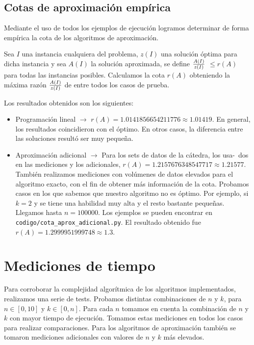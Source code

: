 \documentclass{article}
\begin{document}
\subsection{Cotas de aproximación empírica}

Mediante el uso de todos los ejemplos de ejecución logramos determinar de forma empírica la cota de los algoritmos de aproximación. 

Sea \(I\) una instancia cualquiera del problema, \(z(I)\) una solución óptima para dicha instancia y sea \(A(I)\) la solución aproximada, se define \(A(I) \over z(I)\) \(\leq r(A)\) para todas las instancias posibles. Calculamos la cota $r(A)$ obteniendo la máxima razón \(A(I) \over z(I)\) de entre todos los casos de prueba.

Los resultados obtenidos son los siguientes:
\begin{itemize}
    \item Programación lineal $\rightarrow$ $r(A) = 1.0141856654211776 \approx 1.01419$. En general, los resultados coincidieron con el óptimo. En otros casos, la diferencia entre las soluciones resultó ser muy pequeña.
    \item Aproximación adicional $\rightarrow$ Para los sets de datos de la cátedra, los usa-\ dos en las mediciones y los adicionales, $r(A) = 1.2157676348547717 \approx 1.21577$. También realizamos mediciones con volúmenes de datos elevados para el algoritmo exacto, con el fin de obtener más información de la cota. Probamos casos en los que sabemos que nuestro algoritmo no es óptimo. Por ejemplo, si $k = 2$ y se tiene una habilidad muy alta y el resto bastante pequeñas. Llegamos hasta $n = 100000$. Los ejemplos se pueden encontrar en \texttt{codigo/cota\_aprox\_adicional.py}. El resultado obtenido fue $r(A) = 1.2999951999748 \approx 1.3$.
\end{itemize}



\section{Mediciones de tiempo}
\label{sec:medTiempo}
Para corroborar la complejidad algorítmica de los algoritmos implementados, realizamos una serie de tests. Probamos distintas combinaciones de $n$ y $k$, para $n \in [0, 10]$ y $k \in [0, n]$. Para cada $n$ tomamos en cuenta la combinación de $n$ y $k$ con mayor tiempo de ejecución. Tomamos estas mediciones en todos los casos para realizar comparaciones. Para los algoritmos de aproximación también se tomaron mediciones adicionales con valores de $n$ y $k$ más elevados. 
\end{document}
